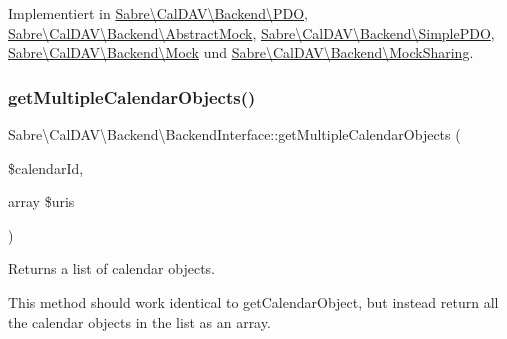 Implementiert in \mbox{\hyperlink{class_sabre_1_1_cal_d_a_v_1_1_backend_1_1_p_d_o_a6a5e51f95be75f19eecbd13c6bb90bbc}{Sabre\textbackslash{}\+Cal\+D\+A\+V\textbackslash{}\+Backend\textbackslash{}\+P\+DO}}, \mbox{\hyperlink{class_sabre_1_1_cal_d_a_v_1_1_backend_1_1_abstract_mock_a0393f4b2e85e510e01d8f7f7b3bc1a08}{Sabre\textbackslash{}\+Cal\+D\+A\+V\textbackslash{}\+Backend\textbackslash{}\+Abstract\+Mock}}, \mbox{\hyperlink{class_sabre_1_1_cal_d_a_v_1_1_backend_1_1_simple_p_d_o_af10ea58aabe1645bc2a6d4845dccda12}{Sabre\textbackslash{}\+Cal\+D\+A\+V\textbackslash{}\+Backend\textbackslash{}\+Simple\+P\+DO}}, \mbox{\hyperlink{class_sabre_1_1_cal_d_a_v_1_1_backend_1_1_mock_a97477c67412f556a2dbaf70c8632642e}{Sabre\textbackslash{}\+Cal\+D\+A\+V\textbackslash{}\+Backend\textbackslash{}\+Mock}} und \mbox{\hyperlink{class_sabre_1_1_cal_d_a_v_1_1_backend_1_1_mock_sharing_a7cc6409f0296b256ee8132d5179afc21}{Sabre\textbackslash{}\+Cal\+D\+A\+V\textbackslash{}\+Backend\textbackslash{}\+Mock\+Sharing}}.

\mbox{\label{interface_sabre_1_1_cal_d_a_v_1_1_backend_1_1_backend_interface_a1ac65bc67e50edce9db902083d0ceb51}} 
\subsubsection{\texorpdfstring{get\+Multiple\+Calendar\+Objects()}{getMultipleCalendarObjects()}}
{\footnotesize\ttfamily Sabre\textbackslash{}\+Cal\+D\+A\+V\textbackslash{}\+Backend\textbackslash{}\+Backend\+Interface\+::get\+Multiple\+Calendar\+Objects (\begin{DoxyParamCaption}\item[{}]{\$calendar\+Id,  }\item[{array}]{\$uris }\end{DoxyParamCaption})}

Returns a list of calendar objects.

This method should work identical to get\+Calendar\+Object, but instead return all the calendar objects in the list as an array.

